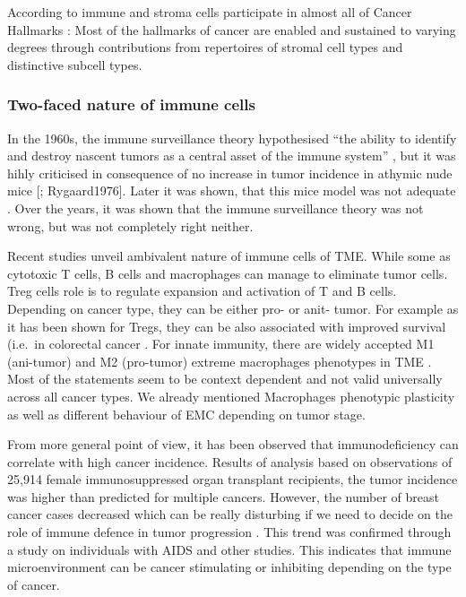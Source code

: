 \documentclass[12pt,]{book}
\theoremstyle{definition}
\theoremstyle{definition}
\theoremstyle{definition}
\theoremstyle{remark}
\begin{document}
According to \citep{Hanahan2012} immune and stroma cells participate in
almost all of Cancer Hallmarks \citep{Hanahan2000, Hanahan2012} : Most
of the hallmarks of cancer are enabled and sustained to varying degrees
through contributions from repertoires of stromal cell types and
distinctive subcell types.

\hypertarget{two-faced-nature-of-immune-cells}{%
\subsubsection{Two-faced nature of immune
cells}\label{two-faced-nature-of-immune-cells}}

In the 1960s, the immune surveillance theory hypothesised ``the ability
to identify and destroy nascent tumors as a central asset of the immune
system'' \citep{Sebeok1976, Burnet1970}, but it was hihly criticised in
consequence of no increase in tumor incidence in athymic nude mice
{[}\citet{Stutman1974}; Rygaard1976{]}. Later it was shown, that this
mice model was not adequate \citep{Cavallo2011}. Over the years, it was
shown that the immune surveillance theory was not wrong, but was not
completely right neither.

Recent studies unveil ambivalent nature of immune cells of TME. While
some as cytotoxic T cells, B cells and macrophages can manage to
eliminate tumor cells. Treg cells role is to regulate expansion and
activation of T and B cells. Depending on cancer type, they can be
either pro- or anit- tumor. For example as it has been shown for Tregs,
they can be also associated with improved survival (i.e.~in colorectal
cancer \citep{Frey2010}. For innate immunity, there are widely accepted
M1 (ani-tumor) and M2 (pro-tumor) extreme macrophages phenotypes in TME
\citep{Qian2010}. Most of the statements seem to be context dependent
and not valid universally across all cancer types. We already mentioned
Macrophages phenotypic plasticity as well as different behaviour of EMC
depending on tumor stage.

From more general point of view, it has been observed that
immunodeficiency can correlate with high cancer incidence. Results of
analysis based on observations of 25,914 female immunosuppressed organ
transplant recipients, the tumor incidence was higher than predicted for
multiple cancers. However, the number of breast cancer cases decreased
which can be really disturbing if we need to decide on the role of
immune defence in tumor progression \citep{Stewart1995}. This trend was
confirmed through a study on individuals with AIDS and other studies.
This indicates that immune microenvironment can be cancer stimulating or
inhibiting depending on the type of cancer.
\end{document}
